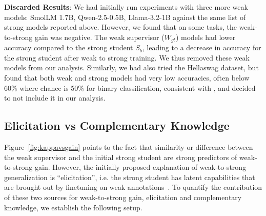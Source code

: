 \textbf{Discarded Results}: We had initially run experiments with three more weak models: SmolLM 1.7B, Qwen-2.5-0.5B, Llama-3.2-1B against the same list of strong models reported above. However, we found that on some tasks, the weak-to-strong gain was negative. The weak supervisor ($W_{gt}$) models had lower accuracy compared to the strong student $S_b$, leading to a decrease in accuracy for the strong student after weak to strong training. We thus removed these weak models from our analysis. Similarly, we had also tried the Hellaswag dataset, but found that both weak and strong models had very low accuracies, often below 60\% where chance is 50\% for binary classification, consistent with \citet{scherlis2024w2seleuther}, and decided to not include it in our analysis.

\subsection{Elicitation vs Complementary Knowledge}
\label{app:elicitation_complementary}
\begin{table*}[htbp]
  \centering
  \caption{\textbf{Models and Sources of Knowledge in Complementary Knowledge vs Elicitation Comparison}. }
  \label{tab:w2s_sources}
\end{table*}

Figure~\ref{fig:kappavsgain} points to the fact that similarity or difference between the weak supervisor and the initial strong student are strong predictors of weak-to-strong gain. However, the initially proposed explanation of weak-to-strong generalization is ``elicitation'', i.e. the strong student has latent capabilities that are brought out by finetuning on weak annotations~\citep{burns2024weaktostrong}. To quantify the contribution of these two sources for weak-to-strong gain, elicitation and complementary knowledge, we establish the following setup.

